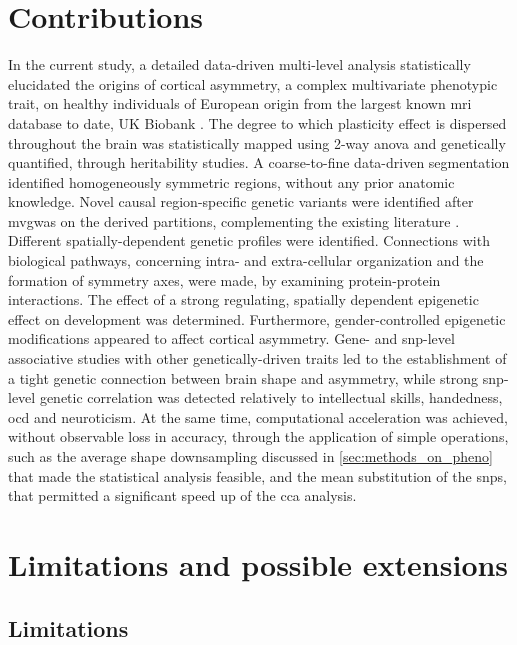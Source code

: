\section{Contributions}
In the current study, a detailed  data-driven multi-level analysis statistically elucidated the origins of cortical asymmetry, a complex multivariate phenotypic trait, on healthy individuals of European origin from the largest known \ac{mri} database to date, UK Biobank \cite{Littlejohns2020}. The degree to which plasticity effect is dispersed throughout the brain was statistically mapped using 2-way \ac{anova} and genetically quantified, through heritability studies. A coarse-to-fine data-driven segmentation identified homogeneously symmetric regions, without any prior anatomic knowledge.  Novel causal region-specific genetic variants were identified after \ac{mvgwas} on the derived partitions, complementing the existing literature \cite{Sha2021}. Different spatially-dependent genetic profiles were identified. Connections with biological pathways, concerning intra- and extra-cellular organization and the formation of symmetry axes, were made, by examining protein-protein interactions. The effect of a strong regulating, spatially dependent epigenetic effect on development was determined. Furthermore, gender-controlled epigenetic modifications appeared to affect cortical asymmetry. Gene- and \ac{snp}-level associative studies  with other genetically-driven traits led to the establishment of a tight genetic connection between  brain shape and asymmetry, while strong \ac{snp}-level genetic correlation was detected relatively to intellectual skills, handedness, \ac{ocd} and neuroticism. At the same time, computational acceleration was achieved, without observable loss in accuracy, through the application of simple operations, such as the average shape downsampling discussed in \autoref{sec:methods_on_pheno} that made the statistical analysis feasible, and the mean substitution of the \acp{snp}, that permitted a significant speed up of the \ac{cca} analysis.

\section{Limitations and possible extensions}
\subsection{Limitations}

